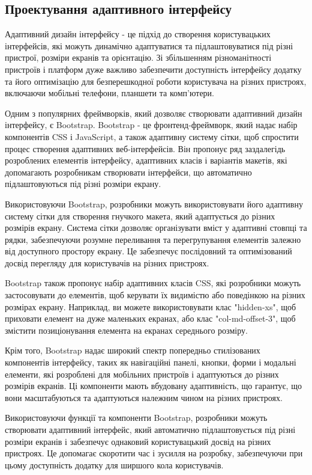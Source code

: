 \subsection{Проектування адаптивного інтерфейсу}
\label{subsec:adaptive-interface-subsection}

Адаптивний дизайн інтерфейсу - це підхід до створення користувацьких інтерфейсів, які можуть динамічно адаптуватися та підлаштовуватися під різні пристрої, розміри екранів та орієнтацію. Зі збільшенням різноманітності пристроїв і платформ дуже важливо забезпечити доступність інтерфейсу додатку та його оптимізацію для безперешкодної роботи користувача на різних пристроях, включаючи мобільні телефони, планшети та комп'ютери.

Одним з популярних фреймворків, який дозволяє створювати адаптивний дизайн інтерфейсу, є Bootstrap. Bootstrap - це фронтенд-фреймворк, який надає набір компонентів CSS і JavaScript, а також адаптивну систему сітки, щоб спростити процес створення адаптивних веб-інтерфейсів. Він пропонує ряд заздалегідь розроблених елементів інтерфейсу, адаптивних класів і варіантів макетів, які допомагають розробникам створювати інтерфейси, що автоматично підлаштовуються під різні розміри екрану.

Використовуючи Bootstrap, розробники можуть використовувати його адаптивну систему сітки для створення гнучкого макета, який адаптується до різних розмірів екрану. Система сітки дозволяє організувати вміст у адаптивні стовпці та рядки, забезпечуючи розумне переливання та перегрупування елементів залежно від доступного простору екрану. Це забезпечує послідовний та оптимізований досвід перегляду для користувачів на різних пристроях.

Bootstrap також пропонує набір адаптивних класів CSS, які розробники можуть застосовувати до елементів, щоб керувати їх видимістю або поведінкою на різних розмірах екрану. Наприклад, ви можете використовувати клас "hidden-xs", щоб приховати елемент на дуже маленьких екранах, або клас "col-md-offset-3", щоб змістити позиціонування елемента на екранах середнього розміру.

Крім того, Bootstrap надає широкий спектр попередньо стилізованих компонентів інтерфейсу, таких як навігаційні панелі, кнопки, форми і модальні елементи, які розроблені для мобільних пристроїв і адаптуються до різних розмірів екранів. Ці компоненти мають вбудовану адаптивність, що гарантує, що вони масштабуються та адаптуються належним чином на різних пристроях.

Використовуючи функції та компоненти Bootstrap, розробники можуть створювати адаптивний інтерфейс, який автоматично підлаштовується під різні розміри екранів і забезпечує однаковий користувацький досвід на різних пристроях. Це допомагає скоротити час і зусилля на розробку, забезпечуючи при цьому доступність додатку для ширшого кола користувачів.

